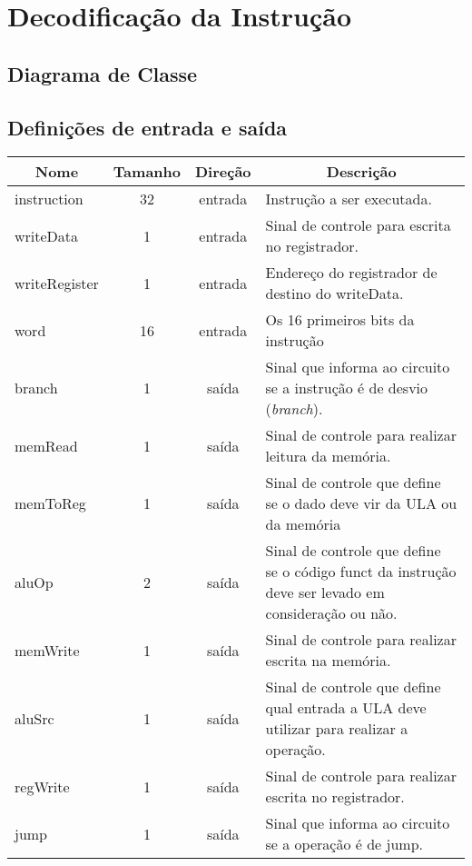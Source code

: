 \section{Decodificação da Instrução}
	\subsection{Diagrama de Classe}
  \begin{figure}[H]
    
  \end{figure}
		
		\subsection{Definições de entrada e saída}
		
	\begin{center}
		\begin{longtable}[pos]{| l | c | c | m{7cm} |} \hline
			\multicolumn{1}{|c|}{\cellcolor[gray]{0.9}\textbf{Nome}} & 
			\multicolumn{1}{c|}{\cellcolor[gray]{0.9}\textbf{Tamanho}} & 
			\multicolumn{1}{c|}{\cellcolor[gray]{0.9}\textbf{Direção}} &
			\multicolumn{1}{c|}{\cellcolor[gray]{0.9}\textbf{Descrição}} \\ \hline
			\endhead
			\hline
			\endlastfoot
			
			instruction & 32 & entrada & Instrução a ser executada. \\ \hline
			writeData & 1 & entrada & Sinal de controle para escrita no registrador. \\ \hline
			writeRegister & 1 & entrada & Endereço do registrador de destino do writeData. \\ \hline
			word & 16 & entrada & Os 16 primeiros bits da instrução \\ \hline
			branch & 1 & saída & Sinal que informa ao circuito se a instrução é de desvio (\textit{branch}). \\ \hline
			memRead & 1 & saída & Sinal de controle para realizar leitura da memória. \\ \hline
			memToReg & 1 & saída & Sinal de controle que define se o dado deve vir da ULA ou da memória \\ \hline
			aluOp & 2 & saída & Sinal de controle que define se o código funct da instrução deve ser levado em consideração ou não. \\ \hline
			memWrite & 1 & saída & Sinal de controle para realizar escrita na memória. \\ \hline
			aluSrc & 1 & saída & Sinal de controle que define qual entrada a ULA deve utilizar para realizar a operação. \\ \hline
			regWrite & 1 & saída & Sinal de controle para realizar escrita no registrador. \\ \hline
			jump & 1 & saída & Sinal que informa ao circuito se a operação é de jump. \\ \hline
		\end{longtable}
	\end{center}
    
